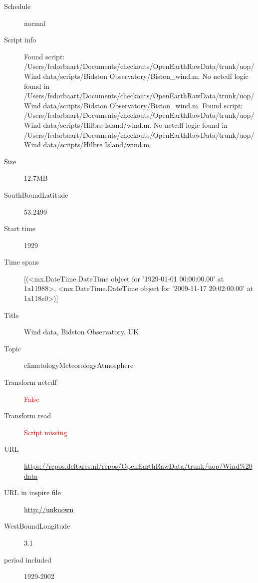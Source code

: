 \documentclass[9]{report}
\begin{document}
\begin{description}
\begin{verbatim}
\end{verbatim}
  \item[Schedule] normal
  \item[Script info] Found script: /Users/fedorbaart/Documents/checkouts/OpenEarthRawData/trunk/uop/Wind data/scripts/Bidston Observatory/Biston\_wind.m.
No netcdf logic found in /Users/fedorbaart/Documents/checkouts/OpenEarthRawData/trunk/uop/Wind data/scripts/Bidston Observatory/Biston\_wind.m.
Found script: /Users/fedorbaart/Documents/checkouts/OpenEarthRawData/trunk/uop/Wind data/scripts/Hilbre Island/wind.m.
No netcdf logic found in /Users/fedorbaart/Documents/checkouts/OpenEarthRawData/trunk/uop/Wind data/scripts/Hilbre Island/wind.m.
  \item[Size] 12.7MB
  \item[SouthBoundLatitude] 53.2499
  \item[Start time] 1929
  \item[Time spans] [(<mx.DateTime.DateTime object for '1929-01-01 00:00:00.00' at 1a11988>, <mx.DateTime.DateTime object for '2009-11-17 20:02:00.00' at 1a118e0>)]
  \item[Title]  Wind data, Bidston Observatory, UK 
  \item[Topic] climatologyMeteorologyAtmosphere
  \item[Transform netcdf] \textcolor{red}{False}
  \item[Transform read] \textcolor{red}{Script missing}
  \item[URL] \href{https://repos.deltares.nl/repos/OpenEarthRawData/trunk/uop/Wind\%20data}{https://repos.deltares.nl/repos/OpenEarthRawData/trunk/uop/Wind\%20data}
  \item[URL in inspire file] \href{http://unknown}{http://unknown}
  \item[WestBoundLongitude] 3.1
  \item[period included] 1929-2002
\end{description}
\end{document}
